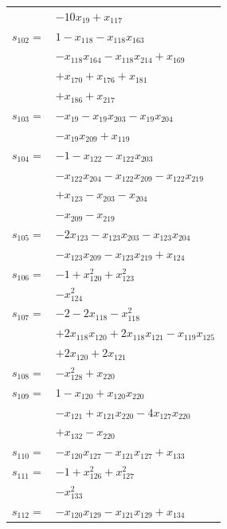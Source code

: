 \begin{longtable}{@{}r@{\;}l@{}}
 & \(\displaystyle -10x_{19} +x_{117}\) \\[3pt]
\(s_{102}=\) & \(\displaystyle 1 -x_{118} -x_{118}x_{163}\) \\
 & \(\displaystyle -x_{118}x_{164} -x_{118}x_{214} +x_{169}\) \\
 & \(\displaystyle +x_{170} +x_{176} +x_{181}\) \\
 & \(\displaystyle +x_{186} +x_{217}\) \\[3pt]
\(s_{103}=\) & \(\displaystyle -x_{19} -x_{19}x_{203} -x_{19}x_{204}\) \\
 & \(\displaystyle -x_{19}x_{209} +x_{119}\) \\[3pt]
\(s_{104}=\) & \(\displaystyle -1 -x_{122} -x_{122}x_{203}\) \\
 & \(\displaystyle -x_{122}x_{204} -x_{122}x_{209} -x_{122}x_{219}\) \\
 & \(\displaystyle +x_{123} -x_{203} -x_{204}\) \\
 & \(\displaystyle -x_{209} -x_{219}\) \\[3pt]
\(s_{105}=\) & \(\displaystyle -2x_{123} -x_{123}x_{203} -x_{123}x_{204}\) \\
 & \(\displaystyle -x_{123}x_{209} -x_{123}x_{219} +x_{124}\) \\[3pt]
\(s_{106}=\) & \(\displaystyle -1 +x_{120}^{2} +x_{123}^{2}\) \\
 & \(\displaystyle -x_{124}^{2}\) \\[3pt]
\(s_{107}=\) & \(\displaystyle -2 -2x_{118} -x_{118}^{2}\) \\
 & \(\displaystyle +2x_{118}x_{120} +2x_{118}x_{121} -x_{119}x_{125}\) \\
 & \(\displaystyle +2x_{120} +2x_{121}\) \\[3pt]
\(s_{108}=\) & \(\displaystyle -x_{128}^{2} +x_{220}\) \\[3pt]
\(s_{109}=\) & \(\displaystyle 1 -x_{120} +x_{120}x_{220}\) \\
 & \(\displaystyle -x_{121} +x_{121}x_{220} -4x_{127}x_{220}\) \\
 & \(\displaystyle +x_{132} -x_{220}\) \\[3pt]
\(s_{110}=\) & \(\displaystyle -x_{120}x_{127} -x_{121}x_{127} +x_{133}\) \\[3pt]
\(s_{111}=\) & \(\displaystyle -1 +x_{126}^{2} +x_{127}^{2}\) \\
 & \(\displaystyle -x_{133}^{2}\) \\[3pt]
\(s_{112}=\) & \(\displaystyle -x_{120}x_{129} -x_{121}x_{129} +x_{134}\) \\[3pt]

\end{longtable}
